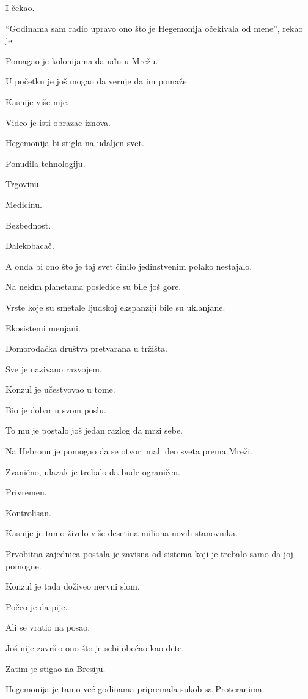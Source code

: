 I čekao.

``Godinama sam radio upravo ono što je Hegemonija očekivala od mene'', rekao je.

Pomagao je kolonijama da uđu u Mrežu.

U početku je još mogao da veruje da im pomaže.

Kasnije više nije.

Video je isti obrazac iznova.

Hegemonija bi stigla na udaljen svet.

Ponudila tehnologiju.

Trgovinu.

Medicinu.

Bezbednost.

Dalekobacač.

A onda bi ono što je taj svet činilo jedinstvenim polako nestajalo.

Na nekim planetama posledice su bile još gore.

Vrste koje su smetale ljudskoj ekspanziji bile su uklanjane.

Ekosistemi menjani.

Domorodačka društva pretvarana u tržišta.

Sve je nazivano razvojem.

Konzul je učestvovao u tome.

Bio je dobar u svom poslu.

To mu je postalo još jedan razlog da mrzi sebe.

\bigskip

Na Hebronu je pomogao da se otvori mali deo sveta prema Mreži.

Zvanično, ulazak je trebalo da bude ograničen.

Privremen.

Kontrolisan.

Kasnije je tamo živelo više desetina miliona novih stanovnika.

Prvobitna zajednica postala je zavisna od sistema koji je trebalo samo da joj pomogne.

Konzul je tada doživeo nervni slom.

Počeo je da pije.

Ali se vratio na posao.

Još nije završio ono što je sebi obećao kao dete.

\bigskip

Zatim je stigao na Bresiju.

Hegemonija je tamo već godinama pripremala sukob sa Proteranima.

